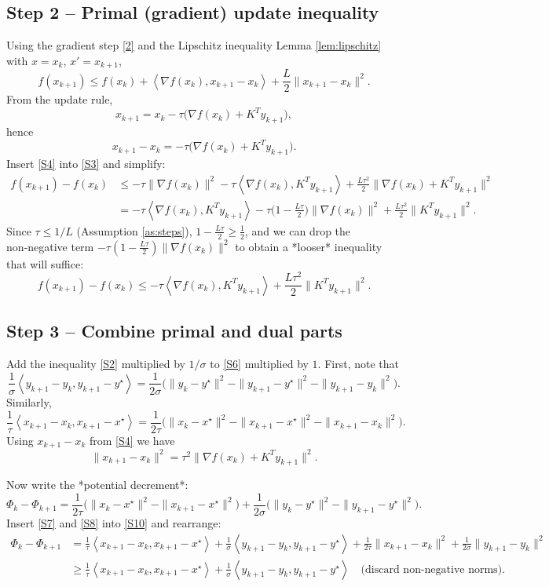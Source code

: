 \documentclass{article}
\newcommand{\inner}[2]{\left\langle #1,#2\right\rangle}
\begin{document}
\subsection*{Step 2 – Primal (gradient) update inequality}
Using the gradient step \eqref{2} and the Lipschitz inequality Lemma \ref{lem:lipschitz} with $x=x_{k}$, $x'=x_{k+1}$,
\[
f(x_{k+1})\le f(x_{k})+\inner{\nabla f(x_{k})}{x_{k+1}-x_{k}}+\frac{L}{2}\|x_{k+1}-x_{k}\|^{2}.
\tag{S3}
\]
From the update rule,
\[
x_{k+1}=x_{k}-\tau\bigl(\nabla f(x_{k})+K^{\!T}y_{k+1}\bigr),
\]
hence
\[
x_{k+1}-x_{k}=-\tau\bigl(\nabla f(x_{k})+K^{\!T}y_{k+1}\bigr).
\tag{S4}
\]
Insert \eqref{S4} into \eqref{S3} and simplify:
\[
\begin{aligned}
f(x_{k+1})-f(x_{k})
&\le -\tau\|\nabla f(x_{k})\|^{2}
-\tau\inner{\nabla f(x_{k})}{K^{\!T}y_{k+1}}
+\frac{L\tau^{2}}{2}\|\nabla f(x_{k})+K^{\!T}y_{k+1}\|^{2}\\
&= -\tau\inner{\nabla f(x_{k})}{K^{\!T}y_{k+1}}
-\tau\bigl(1-\tfrac{L\tau}{2}\bigr)\|\nabla f(x_{k})\|^{2}
+\frac{L\tau^{2}}{2}\|K^{\!T}y_{k+1}\|^{2}.
\end{aligned}
\tag{S5}
\]
Since $\tau\le 1/L$ (Assumption \ref{as:steps}), $1-\frac{L\tau}{2}\ge \frac12$, and we can drop the non‑negative term $-\tau(1-\frac{L\tau}{2})\|\nabla f(x_{k})\|^{2}$ to obtain a *looser* inequality that will suffice:
\[
f(x_{k+1})-f(x_{k})
\le -\tau\inner{\nabla f(x_{k})}{K^{\!T}y_{k+1}}
+\frac{L\tau^{2}}{2}\|K^{\!T}y_{k+1}\|^{2}.
\tag{S6}
\]

\subsection*{Step 3 – Combine primal and dual parts}
Add the inequality \eqref{S2} multiplied by $1/\sigma$ to \eqref{S6} multiplied by $1$.
First, note that
\[
\frac{1}{\sigma}\inner{y_{k+1}-y_{k}}{y_{k+1}-y^{\star}}
= \frac{1}{2\sigma}\bigl(\|y_{k}-y^{\star}\|^{2}-\|y_{k+1}-y^{\star}\|^{2}
-\|y_{k+1}-y_{k}\|^{2}\bigr).
\tag{S7}
\]
Similarly,
\[
\frac{1}{\tau}\inner{x_{k+1}-x_{k}}{x_{k+1}-x^{\star}}
= \frac{1}{2\tau}\bigl(\|x_{k}-x^{\star}\|^{2}-\|x_{k+1}-x^{\star}\|^{2}
-\|x_{k+1}-x_{k}\|^{2}\bigr).
\tag{S8}
\]
Using $x_{k+1}-x_{k}$ from \eqref{S4} we have
\[
\|x_{k+1}-x_{k}\|^{2}= \tau^{2}\|\nabla f(x_{k})+K^{\!T}y_{k+1}\|^{2}.
\tag{S9}
\]

Now write the *potential decrement*:
\[
\Phi_{k}-\Phi_{k+1}
=
\frac{1}{2\tau}\bigl(\|x_{k}-x^{\star}\|^{2}-\|x_{k+1}-x^{\star}\|^{2}\bigr)
+\frac{1}{2\sigma}\bigl(\|y_{k}-y^{\star}\|^{2}-\|y_{k+1}-y^{\star}\|^{2}\bigr).
\tag{S10}
\]
Insert \eqref{S7} and \eqref{S8} into \eqref{S10} and rearrange:
\[
\begin{aligned}
\Phi_{k}-\Phi_{k+1}
&= \frac{1}{\tau}\inner{x_{k+1}-x_{k}}{x_{k+1}-x^{\star}}
+ \frac{1}{\sigma}\inner{y_{k+1}-y_{k}}{y_{k+1}-y^{\star}}
+\frac{1}{2\tau}\|x_{k+1}-x_{k}\|^{2}
+\frac{1}{2\sigma}\|y_{k+1}-y_{k}\|^{2}\\
&\ge
\frac{1}{\tau}\inner{x_{k+1}-x_{k}}{x_{k+1}-x^{\star}}
+ \frac{1}{\sigma}\inner{y_{k+1}-y_{k}}{y_{k+1}-y^{\star}}
\quad\text{(discard non‑negative norms)}.
\end{aligned}
\tag{S11}
\]
\end{document}
